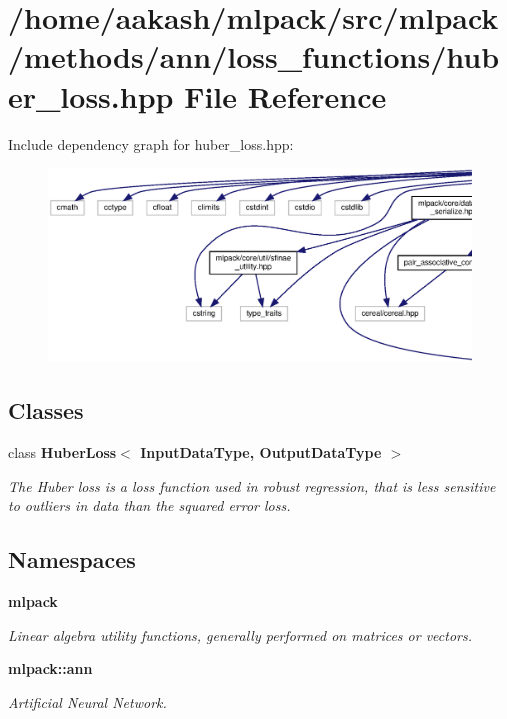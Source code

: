 \section{/home/aakash/mlpack/src/mlpack/methods/ann/loss\+\_\+functions/huber\+\_\+loss.hpp File Reference}
\label{huber__loss_8hpp}
Include dependency graph for huber\+\_\+loss.\+hpp\+:
\nopagebreak
\begin{figure}[H]
\begin{center}
\leavevmode
\includegraphics[width=350pt]{huber__loss_8hpp__incl}
\end{center}
\end{figure}
\subsection*{Classes}
\begin{DoxyCompactItemize}
\item 
class \textbf{ Huber\+Loss$<$ Input\+Data\+Type, Output\+Data\+Type $>$}
\begin{DoxyCompactList}\small\item\em The Huber loss is a loss function used in robust regression, that is less sensitive to outliers in data than the squared error loss. \end{DoxyCompactList}\end{DoxyCompactItemize}
\subsection*{Namespaces}
\begin{DoxyCompactItemize}
\item 
 \textbf{ mlpack}
\begin{DoxyCompactList}\small\item\em Linear algebra utility functions, generally performed on matrices or vectors. \end{DoxyCompactList}\item 
 \textbf{ mlpack\+::ann}
\begin{DoxyCompactList}\small\item\em Artificial Neural Network. \end{DoxyCompactList}\end{DoxyCompactItemize}



